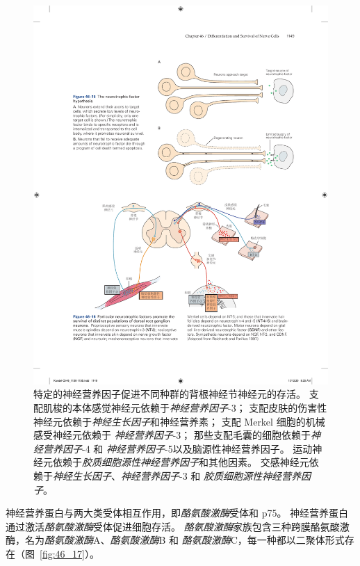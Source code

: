 \begin{figure}[htbp]
	\centering
	\includegraphics[width=0.95\linewidth]{chap46/fig_46_16}
	\caption{特定的神经营养因子促进不同种群的背根神经节神经元的存活。
		支配肌梭的本体感觉神经元依赖于\textit{神经营养因子}-3；
		支配皮肤的伤害性神经元依赖于\textit{神经生长因子}和神经营养素；
		支配 Merkel 细胞的机械感受神经元依赖于 \textit{神经营养因子}-3；
		那些支配毛囊的细胞依赖于\textit{神经营养因子}-4 和 \textit{神经营养因子}-5以及脑源性神经营养因子。
		运动神经元依赖于\textit{胶质细胞源性神经营养因子}和其他因素。
		交感神经元依赖于\textit{神经生长因子}、\textit{神经营养因子}-3 和 \textit{胶质细胞源性神经营养因子}\cite{reichardt1997neurotrophic}。}
	\label{fig:46_16}
\end{figure}


神经营养蛋白与两大类受体相互作用，即\textit{酪氨酸激酶}受体和 p75。
神经营养蛋白通过激活\textit{酪氨酸激酶}受体促进细胞存活。
\textit{酪氨酸激酶}家族包含三种跨膜酪氨酸激酶，名为\textit{酪氨酸激酶}A、\textit{酪氨酸激酶}B 和 \textit{酪氨酸激酶}C，每一种都以二聚体形式存在（图~\ref{fig:46_17}）。


